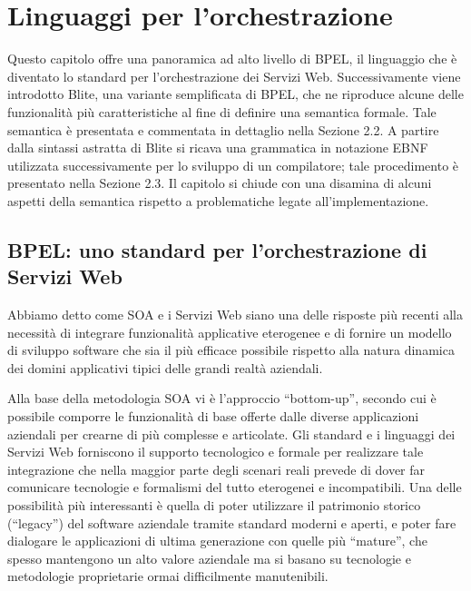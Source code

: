 \chapter{Linguaggi per l'orchestrazione}

Questo capitolo offre una panoramica ad alto livello di BPEL, il linguaggio che è
diventato lo standard per l'orchestrazione dei Servizi Web. Successivamente viene
introdotto Blite, una variante semplificata di BPEL, che ne riproduce alcune
delle funzionalità più caratteristiche al fine di definire una semantica formale.
Tale semantica è presentata e commentata in dettaglio nella Sezione 2.2. A
partire dalla sintassi astratta di Blite si ricava una grammatica in notazione
EBNF utilizzata successivamente per lo sviluppo di un compilatore; tale
procedimento è presentato nella Sezione 2.3. Il capitolo si chiude con una
disamina di alcuni aspetti della semantica rispetto a problematiche legate
all'implementazione.

\section{BPEL: uno standard per l'orchestrazione di Servizi Web}

Abbiamo detto come SOA e i Servizi Web siano una delle risposte più recenti
alla necessità di integrare funzionalità applicative eterogenee e di fornire
un modello di sviluppo software che sia il pi\`u efficace possibile rispetto
alla natura dinamica dei domini applicativi tipici delle grandi realtà
aziendali.

Alla base della metodologia SOA vi è l'approccio ``bottom-up'', secondo cui è
possibile comporre le funzionalità di base offerte dalle diverse applicazioni
aziendali per crearne di più complesse e articolate. Gli standard e i linguaggi
dei Servizi Web forniscono il supporto tecnologico e formale per realizzare tale
integrazione che nella maggior parte degli scenari reali prevede di dover far
comunicare tecnologie e formalismi del tutto eterogenei e incompatibili. Una delle
possibilità più interessanti è quella di poter utilizzare il patrimonio storico
(``legacy'') del software aziendale tramite standard moderni e aperti, e poter
fare dialogare le applicazioni di ultima generazione con quelle più ``mature'',
che spesso mantengono un alto valore aziendale ma si basano su tecnologie e
metodologie proprietarie ormai difficilmente manutenibili.

